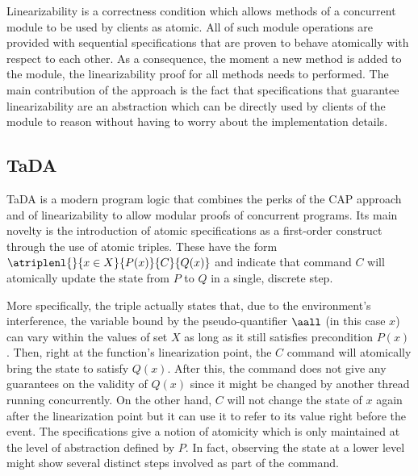 Linearizability \cite{linearizability} is a correctness condition which allows methods of a concurrent module to be used by clients as atomic. All of such module operations are provided with sequential specifications that are proven to behave atomically with respect to each other. As a consequence, the moment a new method is added to the module, the linearizability proof for all methods needs to performed. The main contribution of the approach is the fact that specifications that guarantee linearizability are an abstraction which can be directly used by clients of the module to reason without having to worry about the implementation details.

\subsection{TaDA} \label{s:tada}

TaDA \cite{tada} is a modern program logic that combines the perks of the CAP approach and of linearizability to allow modular proofs of concurrent programs. Its main novelty is the introduction of atomic specifications as a first-order construct through the use of atomic triples. These have the form $\atriplenl{}{x \in X}{P(x)}{C}{Q(x)}$ and indicate that command $C$ will atomically update the state from $P$ to $Q$ in a single, discrete step.

\begin{center}
\end{center}

More specifically, the triple actually states that, due to the environment's interference, the variable bound by the pseudo-quantifier $\aall$ (in this case $x$) can vary within the values of set $X$ as long as it still satisfies precondition $P(x)$. Then, right at the function's linearization point, the $C$ command will atomically bring the state to satisfy $Q(x)$. After this, the command does not give any guarantees on the validity of $Q(x)$ since it might be changed by another thread running concurrently. On the other hand, $C$ will not change the state of $x$ again after the linearization point but it can use it to refer to its value right before the event. The specifications give a notion of atomicity which is only maintained at the level of abstraction defined by $P$. In fact, observing the state at a lower level might show several distinct steps involved as part of the command.

